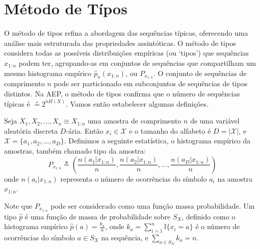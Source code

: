 










\section{Método de Típos}

O método de tipos refina a abordagem das sequências típicas, oferecendo uma
análise mais estruturada das propriedades assintóticas. O método de tipos
considera todas as possíveis distribuições empíricas (ou `tipos') que
sequências $x_{1:n}$ podem ter, agrupando-as em conjuntos de sequências que
compartilham um mesmo histograma empírico $\hat{p}_n(x_{1:n})$, ou
$P_{x_{1:n}}$. O conjunto de sequências de comprimento $n$ pode ser
particionado em subconjuntos de sequências de tipos distintos. Na AEP, o método
de tipos confirma que o número de sequências típicas é $\circeq 2^{nH(X)}$.
Vamos então estabelecer algumas definições.

\begin{definition}[Tipo]
  Seja $X_1, X_2, \ldots, X_n \equiv X_{1:n}$ uma amostra de comprimento $n$ de uma variável aleatória discreta $D$-ária.
  Então $x_i \in \mathcal{X}$ e o tamanho do alfabeto é $D=\vert \mathcal{X} \vert$, e $\mathcal{X}=\{a_1, a_2, \ldots, a_D\}$.
  Definimos a seguinte estatística, o histograma empírico da amostras, também chamado tipo da amostra:
  \begin{equation}
  P_{x_{1:n}} \triangleq \left( \frac{n(a_1|x_{1:n})}{n}, \frac{n(a_2|x_{1:n})}{n}, \ldots, \frac{n(a_D|x_{1:n})}{n} \right)
  \end{equation}
  onde $n(a_i|x_{1:n})$ representa o número de ocorrências do símbolo $a_i$ na amostra $x_{1:n}$.
\end{definition}
Note que $P_{x_{1:n}}$ pode ser considerado como uma função massa probabilidade.
Um tipo $\hat{p}$ é uma função de massa de probabilidade sobre $S_X$, 
definido como o histograma empírico $\hat{p}(a) = \frac{k_a}{n}$, 
onde $k_a = \sum_{i=1}^n \mathbb{I}\{x_i = a\}$ é o número de ocorrências do símbolo $a \in S_X$ na sequência, 
e $\sum_{a \in S_X} k_a = n$.

